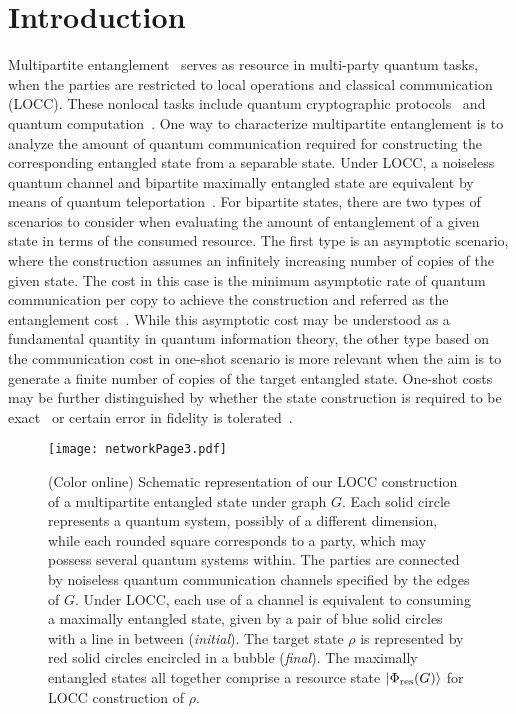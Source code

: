 \documentclass[preprintnumbers,aps,amsmath,amssymb,pra,twocolumn,showpacs,superscriptaddress,floatfix]{revtex4-1}
\def\Ket#1{\left|#1\right\rangle}
\theoremstyle{plain}
\theoremstyle{definition}
\theoremstyle{remark}
\begin{document}
\section{\label{sec:1}Introduction}
Multipartite entanglement~\cite{rev1,rev2,RefWorks:111,rev3,rev4} serves as resource in multi-party quantum tasks, when the parties are restricted to local operations and classical communication (LOCC).  These nonlocal tasks include quantum cryptographic protocols~\cite{secret_sharing,8} and quantum computation~\cite{RefWorks:164}.  One way to characterize multipartite entanglement is to analyze the amount of quantum communication required for constructing the corresponding entangled state from a separable state.  Under LOCC, a noiseless quantum channel and bipartite maximally entangled state are equivalent by means of quantum teleportation~\cite{RefWorks:21}.
For bipartite states, there are two types of scenarios to consider when evaluating the amount of entanglement of a given state in terms of the consumed resource.  The first type is an asymptotic scenario, where the construction assumes an infinitely increasing number of copies of the given state.  The cost in this case is the minimum asymptotic rate of quantum communication per copy to achieve the construction and referred as the entanglement cost~\cite{RefWorks:139, RefWorks:131}.   While this asymptotic cost may be understood as a fundamental quantity in quantum information theory, the other type based on the communication cost in one-shot scenario is more relevant when the aim is to generate a finite number of copies of the target entangled state.  One-shot costs may be further distinguished by whether the state construction is required to be exact~\cite{RefWorks:157} or certain error in fidelity is tolerated~\cite{RefWorks:158,RefWorks:160}.

\begin{figure}
\centering
\texttt{[image: networkPage3.pdf]}
\caption{(Color online) Schematic representation of our LOCC construction of a multipartite entangled state under graph $G$.  Each solid circle represents a quantum system, possibly of a different dimension, while each rounded square corresponds to a party, which may possess several quantum systems within.  The parties are connected by noiseless quantum communication channels specified by the edges of $G$.  Under LOCC, each use of a channel is equivalent to consuming a maximally entangled state, given by a pair of blue solid circles with a line in between (\textit{initial}).  The target state $\rho$ is represented by red solid circles  encircled in a bubble (\textit{final}).  The maximally entangled states all together comprise a resource state $\Ket{\Phi_{\textup{res}}(G)}$ for LOCC construction of $\rho$.
}
\label{fig:intro}
\end{figure}
\end{document}
